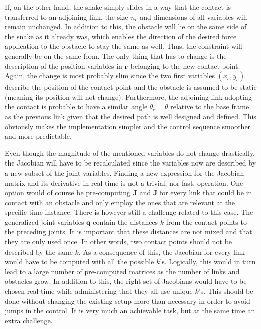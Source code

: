 If, on the other hand, the snake simply slides in a way that the contact is transferred to an adjoining link, the size $n_c$ and dimensions of all variables will remain unchanged. In addition to this, the obstacle will lie on the same side of the snake as it already was, which enables the direction of the desired force application to the obstacle to stay the same as well. Thus, the constraint will generally be on the same form. The only thing that has to change is the description of the position variables in $\mathbf{r}$ belonging to the new contact point. Again, the change is most probably slim since the two first variables $(x_c, y_c)$ describe the position of the contact point and the obstacle is assumed to be static (meaning its position will not change). Furthermore, the adjoining link adopting the contact is probable to have a similar angle $\theta_c = \theta$ relative to the base frame as the previous link given that the desired path is well designed and defined. This obviously makes the implementation simpler and the control sequence smoother and more predictable.

Even though the magnitude of the mentioned variables do not change drastically, the Jacobian will have to be recalculated since the variables now are described by a new subset of the joint variables. Finding a new expression for the Jacobian matrix and its derivative in real time is not a trivial, nor fast, operation. One option would of course be pre-computing $\mathbf{J}$ and $\dot{\mathbf{J}}$ for every link that could be in contact with an obstacle and only employ the ones that are relevant at the specific time instance. There is however still a challenge related to this case. The generalized joint variables $\mathbf{q}$ contain the distances $k$ from the contact points to the preceding joints. It is important that these distances are not mixed and that they are only used once. In other words, two contact points should not be described by the same $k$. As a consequence of this, the Jacobian for every link would have to be computed with all the possible $k$'s. Logically, this would in turn lead to a large number of pre-computed matrices as the number of links and obstacles grow. In addition to this, the right set of Jacobians would have to be chosen real time while administering that they all use unique $k$'s. This should be done without changing the existing setup more than necessary in order to avoid jumps in the control. It is very much an achievable task, but at the same time an extra challenge.

